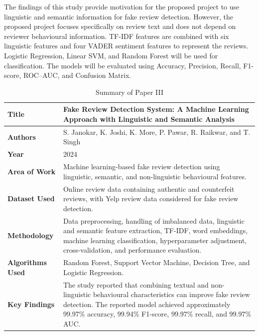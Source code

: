 \documentclass[12pt,a4paper]{report}
\begin{document}
The findings of this study provide motivation for the proposed project to use linguistic and semantic information for fake review detection. However, the proposed project focuses specifically on review text and does not depend on reviewer behavioural information. TF-IDF features are combined with six linguistic features and four VADER sentiment features to represent the reviews. Logistic Regression, Linear SVM, and Random Forest will be used for classification. The models will be evaluated using Accuracy, Precision, Recall, F1-score, ROC--AUC, and Confusion Matrix.

\begin{table}[H]
\centering
\small
\renewcommand{\arraystretch}{1.4}

\begin{tabularx}{0.95\textwidth}{|>{\raggedright\arraybackslash}p{}|X|}
\hline
\textbf{Title} &
Fake Review Detection System: A Machine Learning Approach with Linguistic and Semantic Analysis \\
\hline

\textbf{Authors} &
S. Janokar, K. Joshi, K. More, P. Pawar, R. Raikwar, and T. Singh \\
\hline

\textbf{Year} &
2024 \\
\hline

\textbf{Area of Work} &
Machine learning-based fake review detection using linguistic, semantic, and non-linguistic behavioural features. \\
\hline

\textbf{Dataset Used} &
Online review data containing authentic and counterfeit reviews, with Yelp review data considered for fake review detection. \\
\hline

\textbf{Methodology} &
Data preprocessing, handling of imbalanced data, linguistic and semantic feature extraction, TF-IDF, word embeddings, machine learning classification, hyperparameter adjustment, cross-validation, and performance evaluation. \\
\hline

\textbf{Algorithms Used} &
Random Forest, Support Vector Machine, Decision Tree, and Logistic Regression. \\
\hline

\textbf{Key Findings} &
The study reported that combining textual and non-linguistic behavioural characteristics can improve fake review detection. The reported model achieved approximately 99.97\% accuracy, 99.94\% F1-score, 99.97\% recall, and 99.97\% AUC. \\
\hline

\end{tabularx}

\caption{Summary of Paper III}
\label{tab:paper3}
\end{table}
\end{document}
